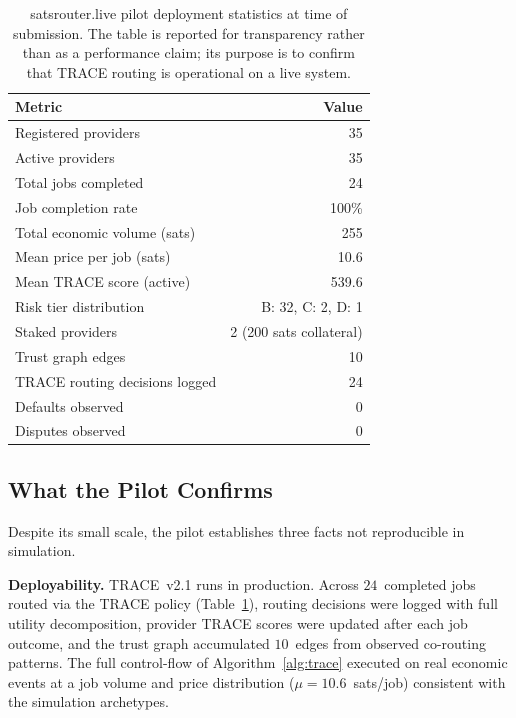 \documentclass[sigconf,nonacm,10pt]{acmart}
\begin{document}
\begin{table}[t]
  \centering
  \caption{satsrouter.live pilot deployment statistics at time of
    submission. The table is reported for transparency rather than
    as a performance claim; its purpose is to confirm that TRACE
    routing is operational on a live system.}
  \label{tab:deployment}
  \footnotesize
  \begin{tabular}{lr}
    \toprule
    Metric & Value \\
    \midrule
    Registered providers            & 35 \\
    Active providers                & 35 \\
    Total jobs completed            & 24 \\
    Job completion rate             & 100\% \\
    Total economic volume (sats)    & 255 \\
    Mean price per job (sats)       & 10.6 \\
    Mean TRACE score (active)       & 539.6 \\
    Risk tier distribution          & B: 32, C: 2, D: 1 \\
    Staked providers                & 2 (200 sats collateral) \\
    Trust graph edges               & 10 \\
    TRACE routing decisions logged  & 24 \\
    Defaults observed               & 0 \\
    Disputes observed               & 0 \\
    \bottomrule
  \end{tabular}
\end{table}

\subsection{What the Pilot Confirms}

Despite its small scale, the pilot establishes three facts not
reproducible in simulation.

\noindent\textbf{Deployability.}
TRACE~v2.1 runs in production. Across $24$~completed jobs routed via
the TRACE policy (Table~\ref{tab:deployment}), routing decisions were
logged with full utility decomposition, provider TRACE scores were
updated after each job outcome, and the trust graph accumulated
$10$~edges from observed co-routing patterns. The full control-flow
of Algorithm~\ref{alg:trace} executed on real economic events at a
job volume and price distribution ($\mu = 10.6$~sats/job) consistent
with the simulation archetypes.
\end{document}
